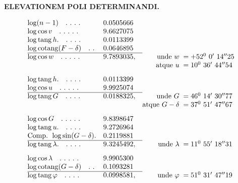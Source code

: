 \par\clearpage
\begingroup
\pagestyle{empty}
\renewcommand{\footnoterule}{\kern-3pt\hrule width .25\linewidth\kern2.6pt}
\noindent{}%
\makebox[12mm][l]{}%
\parbox[t]{\dimexpr\linewidth-24mm\relax}{\centering\fontsize{7.4}{9.2}\selectfont\bfseries ELEVATIONEM POLI DETERMINANDI.\par}%
\par\nobreak\smallskip
\[
\begin{array}{@{}l@{\quad}r@{}l@{\quad}r@{\;}l@{}}
\log(n-1)\quad .\ .\ .\ .&0.0505666&&&\\
\log\cos v\quad .\ .\ .\ .\ .&9.6627075&&&\\
\log\operatorname{tang}h.\quad .\ .\ .\ .&0.0113399&&&\\
\log\operatorname{cotang}(F-\delta)\quad .\ .&0.0646895&&&\\\cline{1-3}
\log\cos w\quad .\ .\ .\ .\ .&9.7893035&,&\text{unde }w&{}=+52^0\ 0'\ 14''25\\
&&&\text{atque }u&{}=10^0\ 36'\ 44''54\\[8pt]
\log\operatorname{tang}h.\quad .\ .\ .\ .&0.0113399&&&\\
\log\cos u\quad .\ .\ .\ .\ .&9.9925074&&&\\\cline{1-3}
\log\operatorname{tang}G\quad .\ .\ .\ .&0.0188325&,&\text{unde }G&{}=46^0\ 14'\ 30''77\\
&&&\text{atque }G-\delta&{}=37^0\ 51'\ 47''67\\[8pt]
\log\cos G\quad .\ .\ .\ .\ .&9.8398647&&&\\
\log\operatorname{tang}u.\quad .\ .\ .\ .&9.2726964&&&\\
\text{Comp. }\log\sin(G-\delta).&0.2119881&&&\\\cline{1-3}
\log\operatorname{tang}\lambda.\quad .\ .\ .\ .&9.3245492&,&\text{unde }\lambda&{}=11^0\ 55'\ 18''31\\[8pt]
\log\cos\lambda\quad .\ .\ .\ .\ .&9.9905300&&&\\
\log\operatorname{cotang}(G-\delta)\quad .\ .&0.1093281&&&\\\cline{1-3}
\log\operatorname{tang}\varphi\quad .\ .\ .\ .&0.0998581&,&\text{unde }\varphi&{}=51^0\ 31'\ 47''19
\end{array}
\]

